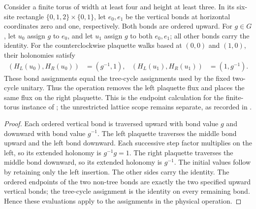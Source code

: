 \begin{lemma}%
    \label{thm:peps_torus_two_plaquette_flux_holonomy}
    \leanok
    Consider a finite torus of width at least four and height at least three.
    In its six-site rectangle $\{0,1,2\}\times\{0,1\}$, let $e_0,e_1$
    be the vertical bonds at horizontal coordinates zero and one, respectively.
    Both bonds are ordered upward. For $g\in G$, let $u_0$ assign $g$ to
    $e_0$, and let $u_1$ assign $g$ to both $e_0,e_1$; all other bonds carry
    the identity. For the counterclockwise plaquette walks based at $(0,0)$
    and $(1,0)$, their holonomies satisfy
    \begin{align}
        (H_L(u_0),H_R(u_0)) & =(g^{-1},1), &
        (H_L(u_1),H_R(u_1)) & =(1,g^{-1}).
    \end{align}
    These bond assignments equal the tree-cycle assignments used by
    the fixed two-cycle unitary. Thus the operation removes the left
    plaquette flux and places the same flux on the right plaquette.
    This is the endpoint calculation for the finite-torus instance
    of \cite[Theorem~6.16]{Schuch2010PEPS}; the unrestricted lattice scope
    remains separate, as recorded in \cite{gap:rmp_peps_quantum_double_g_isometry}.
\end{lemma}

\begin{proof}\leanok
    Each ordered vertical bond is traversed upward with bond value $g$ and
    downward with bond value $g^{-1}$. The left plaquette traverses the middle
    bond upward and the left bond downward. Each successive step factor
    multiplies on the left, so its extended holonomy is $g^{-1}g=1$.
    The right plaquette traverses the middle bond downward, so its extended
    holonomy is $g^{-1}$. The initial values follow by retaining only the
    left insertion. The other sides carry the identity.
    The ordered endpoints of the two non-tree bonds are exactly the two
    specified upward vertical bonds; the tree-cycle assignment is the identity
    on every remaining bond. Hence these evaluations apply to the
    assignments in the physical operation.
\end{proof}
